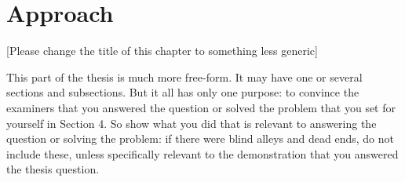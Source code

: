\chapter{Approach}\label{approach}
[Please change the title of this chapter to something less generic]

This part of the thesis is much more free-form. It may have one or several sections and subsections. But it all has only one purpose: to convince the examiners that you answered the question or solved the problem that you set for yourself in Section 4. So show what you did that is relevant to answering the question or solving the problem: if there were blind alleys and dead ends, do not include these, unless specifically relevant to the demonstration that you answered the thesis question.
